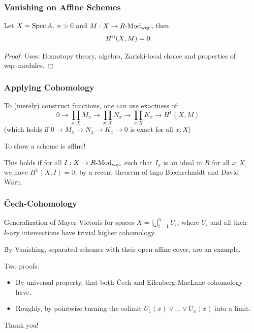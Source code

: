 \documentclass{beamer}
\begin{document}
\begin{frame}
\begin{minipage}{.4\linewidth}
  \end{minipage}
  \pause

\end{frame}

\begin{frame}
  \frametitle{Vanishing on Affine Schemes}
  \begin{theorem}
    Let $X=\operatorname{Spec} A$, $n>0$ and $M:X\to R\text{-}\mathrm{Mod}_{\mathrm{wqc}}$, then
    \[
      H^n(X,M)=0
      \rlap{.}
    \]
  \end{theorem}
  \pause
  \begin{proof}
    Uses: Homotopy theory, algebra, Zariski-local choice and properties of wqc-modules.
  \end{proof}
\end{frame}

\begin{frame}
  \frametitle{Applying Cohomology}
  To (merely) construct functions, one can use exactness of:
  \[
    0\to \prod_{x:X}M_x\to \prod_{x:X}N_x\to \prod_{x:X}K_x\to H^1(X,M)
  \]
  (which holds if $0\to M_x\to N_x\to K_x\to 0$ is exact for all $x:X$)

  \vspace{1.3cm}
  \pause
  To show a scheme is affine!

  This holds if for all $I:X\to R\text{-}\mathrm{Mod}_{\mathrm{wqc}}$ such that $I_x$ is an ideal in $R$ for all $x:X$,
  we have $H^1(X,I)=0$, by a recent theorem of Ingo Blechschmidt and David Wärn.
\end{frame}

\begin{frame}
  \frametitle{\v{C}ech-Cohomology}
  Generalization of Mayer-Vietoris for spaces $X=\bigcup_{i=1}^nU_i$, where $U_i$ and all their $k$-ary intersections have trivial higher cohomology.
  
  \pause
  By Vanishing, separated schemes with their open affine cover, are an example.
  
  \pause
  Two proofs:
  \begin{itemize}
  \item By universal property, that both \v{C}ech and Eilenberg-MacLane cohomology have.
  \item Roughly, by pointwise turning the colimit $U_1(x)\vee\dots\vee U_n(x)$ into a limit.
  \end{itemize}
\end{frame}

\begin{frame}
  \centering
  Thank you!
\end{frame}
\end{document}
